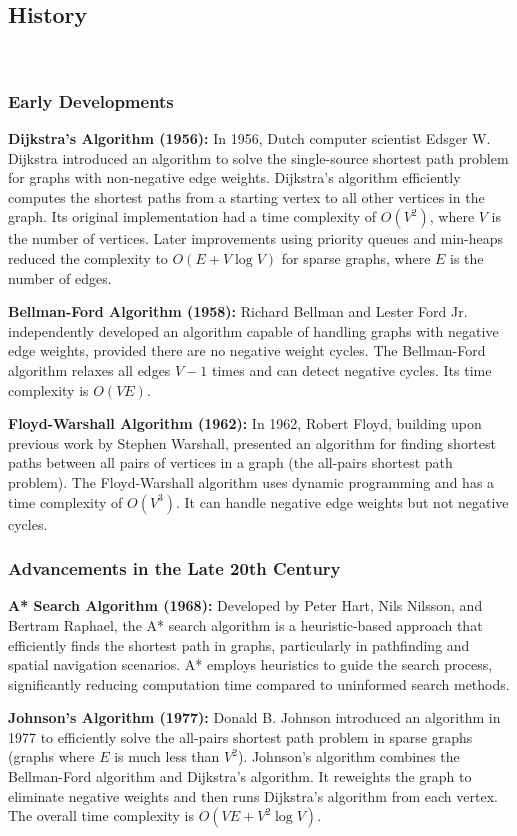 \documentclass[11pt]{article}
\theoremstyle{plain}
\begin{document}
\subsection{History}\
\subsubsection{Early Developments}

\textbf{Dijkstra's Algorithm (1956):} In 1956, Dutch computer scientist Edsger W. Dijkstra introduced an algorithm to solve the single-source shortest path problem for graphs with non-negative edge weights. Dijkstra's algorithm efficiently computes the shortest paths from a starting vertex to all other vertices in the graph. Its original implementation had a time complexity of \( O(V^2) \), where \( V \) is the number of vertices. Later improvements using priority queues and min-heaps reduced the complexity to \( O(E + V \log V) \) for sparse graphs, where \( E \) is the number of edges.

\textbf{Bellman-Ford Algorithm (1958):} Richard Bellman and Lester Ford Jr. independently developed an algorithm capable of handling graphs with negative edge weights, provided there are no negative weight cycles. The Bellman-Ford algorithm relaxes all edges \( V-1 \) times and can detect negative cycles. Its time complexity is \( O(VE) \).

\textbf{Floyd-Warshall Algorithm (1962):} In 1962, Robert Floyd, building upon previous work by Stephen Warshall, presented an algorithm for finding shortest paths between all pairs of vertices in a graph (the all-pairs shortest path problem). The Floyd-Warshall algorithm uses dynamic programming and has a time complexity of \( O(V^3) \). It can handle negative edge weights but not negative cycles.

\subsubsection{Advancements in the Late 20th Century}

\textbf{A* Search Algorithm (1968):} Developed by Peter Hart, Nils Nilsson, and Bertram Raphael, the A* search algorithm is a heuristic-based approach that efficiently finds the shortest path in graphs, particularly in pathfinding and spatial navigation scenarios. A* employs heuristics to guide the search process, significantly reducing computation time compared to uninformed search methods.

\textbf{Johnson's Algorithm (1977):} Donald B. Johnson introduced an algorithm in 1977 to efficiently solve the all-pairs shortest path problem in sparse graphs (graphs where \( E \) is much less than \( V^2 \)). Johnson's algorithm combines the Bellman-Ford algorithm and Dijkstra's algorithm. It reweights the graph to eliminate negative weights and then runs Dijkstra's algorithm from each vertex. The overall time complexity is \( O(VE + V^2 \log V) \).
\end{document}
